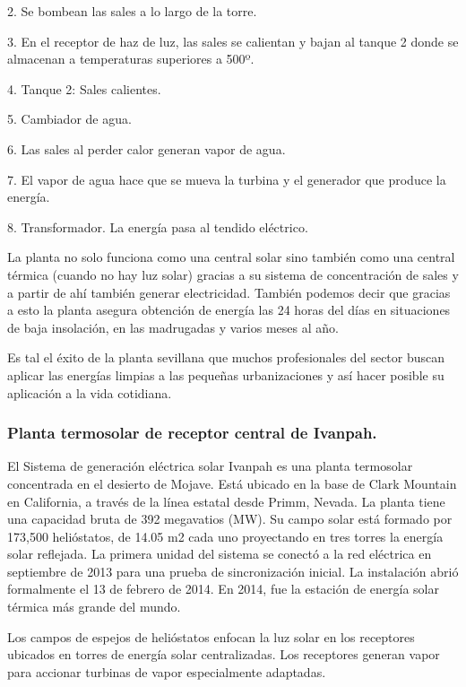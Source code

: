 2. Se bombean las sales a lo largo de la torre.

3. En el receptor de haz de luz, las sales se calientan y bajan al tanque 2 donde se almacenan a temperaturas superiores a 500º.

4. Tanque 2: Sales calientes.

5. Cambiador de agua.

6. Las sales al perder calor generan vapor de agua.

7. El vapor de agua hace que se mueva la turbina y el generador que produce la energía.

8. Transformador. La energía pasa al tendido eléctrico.

La planta no solo funciona como una central solar sino también como una central térmica (cuando no hay luz solar) gracias a su sistema de concentración de sales y a partir de ahí también generar electricidad. También podemos decir que gracias a esto la planta asegura obtención de energía las 24 horas del días en situaciones de baja insolación, en las madrugadas y varios meses al año.

Es tal el éxito de la planta sevillana que muchos profesionales del sector buscan aplicar las energías limpias a las pequeñas urbanizaciones y así hacer posible su aplicación a la vida cotidiana. \cite{PonsWebSite}



\subsubsection{Planta termosolar de receptor central de Ivanpah.}

El Sistema de generación eléctrica solar Ivanpah es una planta termosolar concentrada en el desierto de Mojave. Está ubicado en la base de Clark Mountain en California, a través de la línea estatal desde Primm, Nevada. La planta tiene una capacidad bruta de 392 megavatios (MW). Su campo solar está formado por 173,500 helióstatos, de 14.05 m2 cada uno proyectando en tres torres la energía solar reflejada. La primera unidad del sistema se conectó a la red eléctrica en septiembre de 2013 para una prueba de sincronización inicial. La instalación abrió formalmente el 13 de febrero de 2014. En 2014, fue la estación de energía solar térmica más grande del mundo.
 
Los campos de espejos de helióstatos enfocan la luz solar en los receptores ubicados en torres de energía solar centralizadas. Los receptores generan vapor para accionar turbinas de vapor especialmente adaptadas.
 
